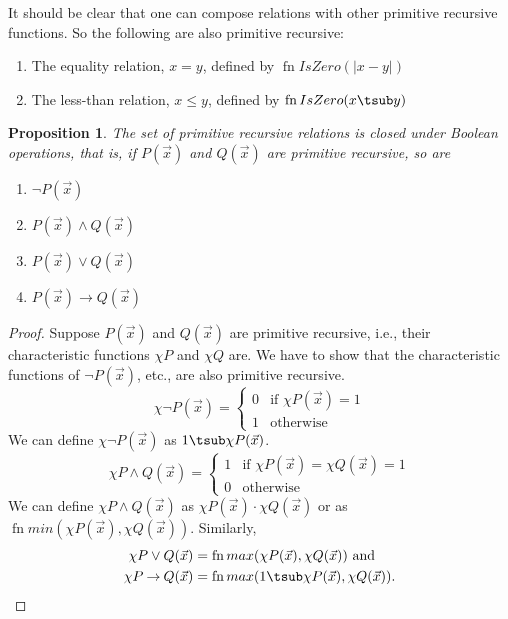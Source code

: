 \documentclass[10pt,a4paper]{article}
\theoremstyle{plain}
\newtheorem{prop}[thm]{Proposition}
\theoremstyle{definition}
\theoremstyle{remark}
\providecommand{\lif}{\mathbin{\rightarrow}}
\providecommand{\Char}{\chi}
\providecommand{\fn}{\operatorname{fn}}
\providecommand{\fn}{\operatorname{fn}}
\begin{document}
It should be clear that one can compose relations with other primitive
recursive functions. So the following are also primitive recursive:
\begin{enumerate}
\item The equality relation, $x = y$, defined by $\fn{IsZero}(\left|x -
  y\right|)$
\item The less-than relation, $x \leq y$, defined by $\fn{IsZero}(x
  \tsub y)$
\end{enumerate}


\begin{prop}
  The set of primitive recursive relations is closed under Boolean
  operations, that is, 
  if $P(\vec x)$ and $Q(\vec x)$ are primitive recursive, so are
  \begin{enumerate}
  \item $\lnot P(\vec x)$
  \item $P(\vec x) \land Q(\vec x)$
  \item $P(\vec x) \lor Q(\vec x)$
  \item $P(\vec x) \lif Q(\vec x)$
  \end{enumerate}
\end{prop}

\begin{proof}
  Suppose $P(\vec x)$ and $Q(\vec x)$ are primitive recursive, i.e.,
  their characteristic functions $\Char{P}$ and $\Char{Q}$ are.  We
  have to show that the characteristic functions of $\lnot P(\vec x)$,
  etc., are also primitive recursive.
  \[
  \Char{\lnot P}(\vec x) = \begin{cases}
    0 & \text{if $\Char{P}(\vec x) = 1$}\\
    1 & \text{otherwise}
  \end{cases}
  \]
  We can define $\Char{\lnot P}(\vec x)$ as $1 \tsub \Char{P}(\vec x)$.
  \[
  \Char{P \land Q}(\vec x) = \begin{cases}
    1 & \text{if $\Char{P}(\vec x) = \Char{Q}(\vec x) = 1$}\\
    0 & \text{otherwise}
  \end{cases}
  \]
  We can define $\Char{P \land Q}(\vec x)$ as $\Char{P}(\vec x) \cdot
  \Char{Q}(\vec x)$ or as $\fn{min}(\Char{P}(\vec x), \Char{Q}(\vec
  x))$. Similarly, 
  \begin{align*}
    \Char{P \lor Q}(\vec x) & = \fn{max}(\Char{P}(\vec x), \Char{Q}(\vec x)) \text{ and}\\
    \Char{P \lif Q}(\vec x) & = \fn{max}(1 \tsub
  \Char{P}(\vec x), \Char{Q}(\vec x)).
  \end{align*}
\end{proof}
\end{document}
